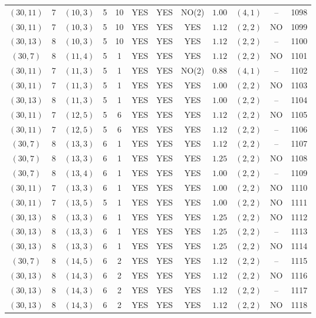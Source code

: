 \begin{longtable}{|c|c|c|c|c|c|c|c|c|c|c|c|}
$(30,11)$ & 7 & $(10,3)$ & 5 & 10 & YES & YES & NO(2) & $1.00$ & $(4,1)$ & -- & 1098\\
$(30,11)$ & 7 & $(10,3)$ & 5 & 10 & YES & YES & YES & $1.12$ & $(2,2)$ & NO & 1099\\
$(30,13)$ & 8 & $(10,3)$ & 5 & 10 & YES & YES & YES & $1.12$ & $(2,2)$ & -- & 1100\\
$(30,7)$ & 8 & $(11,4)$ & 5 & 1 & YES & YES & YES & $1.12$ & $(2,2)$ & NO & 1101\\
$(30,11)$ & 7 & $(11,3)$ & 5 & 1 & YES & YES & NO(2) & $0.88$ & $(4,1)$ & -- & 1102\\
$(30,11)$ & 7 & $(11,3)$ & 5 & 1 & YES & YES & YES & $1.00$ & $(2,2)$ & NO & 1103\\
$(30,13)$ & 8 & $(11,3)$ & 5 & 1 & YES & YES & YES & $1.00$ & $(2,2)$ & -- & 1104\\
$(30,11)$ & 7 & $(12,5)$ & 5 & 6 & YES & YES & YES & $1.12$ & $(2,2)$ & NO & 1105\\
$(30,11)$ & 7 & $(12,5)$ & 5 & 6 & YES & YES & YES & $1.12$ & $(2,2)$ & -- & 1106\\
$(30,7)$ & 8 & $(13,3)$ & 6 & 1 & YES & YES & YES & $1.12$ & $(2,2)$ & -- & 1107\\
$(30,7)$ & 8 & $(13,3)$ & 6 & 1 & YES & YES & YES & $1.25$ & $(2,2)$ & NO & 1108\\
$(30,7)$ & 8 & $(13,4)$ & 6 & 1 & YES & YES & YES & $1.00$ & $(2,2)$ & -- & 1109\\
$(30,11)$ & 7 & $(13,3)$ & 6 & 1 & YES & YES & YES & $1.00$ & $(2,2)$ & NO & 1110\\
$(30,11)$ & 7 & $(13,5)$ & 5 & 1 & YES & YES & YES & $1.00$ & $(2,2)$ & NO & 1111\\
$(30,13)$ & 8 & $(13,3)$ & 6 & 1 & YES & YES & YES & $1.25$ & $(2,2)$ & NO & 1112\\
$(30,13)$ & 8 & $(13,3)$ & 6 & 1 & YES & YES & YES & $1.25$ & $(2,2)$ & -- & 1113\\
$(30,13)$ & 8 & $(13,3)$ & 6 & 1 & YES & YES & YES & $1.25$ & $(2,2)$ & NO & 1114\\
$(30,7)$ & 8 & $(14,5)$ & 6 & 2 & YES & YES & YES & $1.12$ & $(2,2)$ & -- & 1115\\
$(30,13)$ & 8 & $(14,3)$ & 6 & 2 & YES & YES & YES & $1.12$ & $(2,2)$ & NO & 1116\\
$(30,13)$ & 8 & $(14,3)$ & 6 & 2 & YES & YES & YES & $1.12$ & $(2,2)$ & -- & 1117\\
$(30,13)$ & 8 & $(14,3)$ & 6 & 2 & YES & YES & YES & $1.12$ & $(2,2)$ & NO & 1118\\

\end{longtable}
